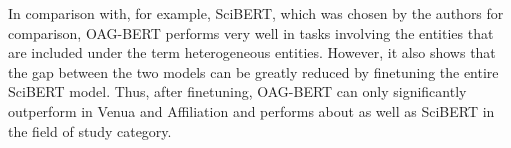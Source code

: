 	In comparison with, for example, SciBERT, which was chosen by the authors for comparison, OAG-BERT performs very well in tasks involving the entities that are included under the term heterogeneous entities. However, it also shows that the gap between the two models can be greatly reduced by finetuning the entire SciBERT model. Thus, after finetuning, OAG-BERT can only significantly outperform in Venua and Affiliation and performs about as well as SciBERT in the field of study category.\cite{Liu2021}
